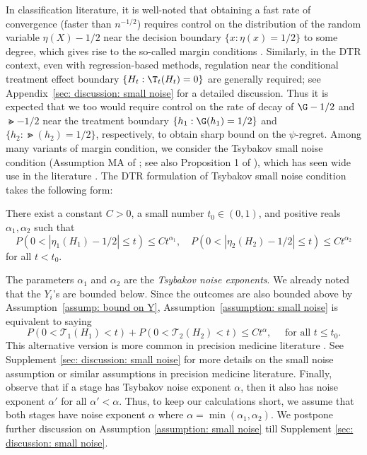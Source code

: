 \documentclass[preprint] {imsart}
\begin{document}
In  classification literature, it is well-noted that obtaining a fast rate of convergence (faster than $n^{-1/2}$) requires control on the distribution of the random variable $\eta(X)-1/2$ near the decision boundary $\{x:\eta(x)=1/2\}$ to some degree, which gives rise to the so-called  margin conditions \citep{tsybakov2004, audibert2007}. Similarly, in the DTR context, even with regression-based methods, regulation near the conditional treatment effect boundary $\{H_t:\T_t(H_t)=0\}$
are generally required; see Appendix~\ref{sec: discussion: small noise} for a detailed discussion.
Thus it is expected that we too would require  control on the rate of decay of $\G-1/2$ and $\Gt-1/2$ near the treatment boundary $\{h_1:\G(h_1)=1/2\}$ and $\{h_2:\Gt(h_2)=1/2\}$, respectively, to obtain sharp bound on the $\psi$-regret.
Among  many variants of margin condition,  we consider the Tsybakov small noise condition (Assumption MA of \cite{audibert2007}; see also Proposition 1 of \cite{tsybakov2004}), which has seen wide use in the literature \citep{audibert2007, steinwart2007, blanchard2008}. The DTR formulation of Tsybakov  small noise condition takes the following form:
\begin{assumption}
\label{assumption: small noise}
There exist a constant $C>0$, a small number $t_0\in(0,1)$, and positive reals $\alpha_1,\alpha_2$ such that
\[P( 0<|\eta_1(H_1)-1/2|\leq t)\leq Ct^{\alpha_1},\quad  P( 0<|\eta_2(H_2)-1/2|\leq t)\leq C t^{\alpha_2}\]
for all $t<t_0$.
\end{assumption}
The parameters $\alpha_1$ and $\alpha_2$ are the \emph{Tsybakov noise exponents}. We already noted that the $Y_i$'s are bounded below.
 Since the outcomes are also bounded above by Assumption~\ref{assump: bound on Y}, 
 Assumption~\ref{assumption: small noise} is equivalent to saying
\begin{equation}\label{def: small noise: treatment effect}
    P(0<\mathcal T_1(H_1)<t)+P(0<\mathcal T_2(H_2)<t)\leq Ct^{\alpha},\quad\text{ for all }t\leq t_0.
\end{equation}
This alternative version is  more common in precision medicine literature \citep{qian2011, luedtke2016}. See Supplement \ref{sec: discussion: small noise} for more details on the small noise assumption or similar assumptions in precision medicine literature. 
Finally, observe that if a stage has Tsybakov noise exponent $\alpha$, then it also has noise exponent $\alpha'$ for all $\alpha'<\alpha$.  
Thus, to keep our calculations short, we assume that both stages have noise exponent $\alpha$ where $\alpha=\min(\alpha_1,\alpha_2)$. We postpone further discussion on Assumption \ref{assumption: small noise} till Supplement \ref{sec: discussion: small noise}.
\end{document}
